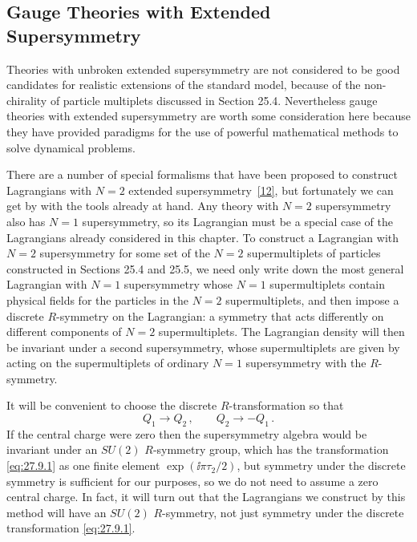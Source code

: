 
\subsection[Gauge Theories with Extended Supersymmetry]{Gauge Theories with
Extended Supersymmetry\footnotemark}

Theories with unbroken extended supersymmetry are not considered to be good
candidates for realistic extensions of the standard model, because of the
non-chirality of particle multiplets discussed in Section 25.4. Nevertheless
gauge theories with extended supersymmetry are worth some consideration here
because they have provided paradigms for the use of powerful mathematical
methods to solve dynamical problems.

There are a number of special formalisms that have been proposed to construct
Lagrangians with \(N=2\) extended
supersymmetry~\hyperref[ch27-ref-12]{[12]}, but fortunately we can get by with
the tools already at hand. Any theory with \(N=2\) supersymmetry also has
\(N=1\) supersymmetry, so its Lagrangian must be a special case of the
Lagrangians already considered in this chapter. To construct a Lagrangian with
\(N=2\) supersymmetry for some set of the \(N=2\) supermultiplets of particles
constructed in Sections 25.4 and 25.5, we need only write down the most general
Lagrangian with \(N=1\) supersymmetry whose \(N=1\) supermultiplets contain
physical fields for the particles in the \(N=2\) supermultiplets, and then
impose a discrete \(R\)-symmetry on the Lagrangian: a symmetry that acts
differently on different components of \(N=2\) supermultiplets. The Lagrangian
density will then be invariant under a second supersymmetry, whose
supermultiplets are given by acting on the supermultiplets of ordinary \(N=1\)
supersymmetry with the \(R\)-symmetry.

It will be convenient to choose the discrete \(R\)-transformation so that
\begin{equation}
  Q_1\longrightarrow Q_2\,,
  \qquad
  Q_2\longrightarrow-Q_1\,.
  \tag{27.9.1}\label{eq:27.9.1}
\end{equation}
If the central charge were zero then the supersymmetry algebra would be
invariant under an \(SU(2)\) \(R\)-symmetry group, which has the transformation
\eqref{eq:27.9.1} as one finite element \(\exp(\ii\pi\tau_2/2)\), but symmetry
under the discrete symmetry is sufficient for our purposes, so we do not need
to assume a zero central charge. In fact, it will turn out that the Lagrangians
we construct by this method will have an \(SU(2)\) \(R\)-symmetry, not just
symmetry under the discrete transformation \eqref{eq:27.9.1}.

